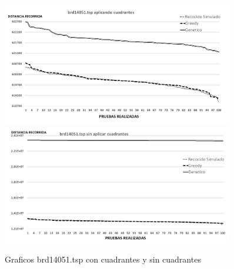  \begin{figure}[hbtp]
    \centering
        \includegraphics[width=0.9\textwidth]{PruebasResultados/Experimentos_Graficos_Con/brd14051.png}
        \includegraphics[width=0.9\textwidth]{PruebasResultados/Experimentos_Graficos_Sin/brd14051.png}
        \caption{Graficos brd14051.tsp con cuadrantes y sin cuadrantes}
        \label{fig:brd14051_grafica.png}
\end{figure}
\newpage

